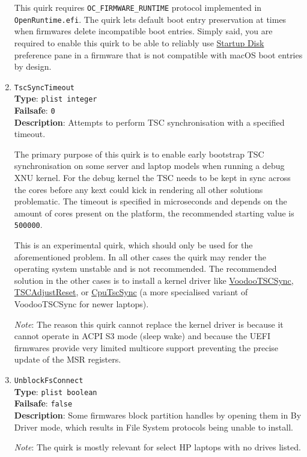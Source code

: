 \documentclass[]{article}
\begin{document}
\begin{enumerate}
  This quirk requires \texttt{OC\_FIRMWARE\_RUNTIME} protocol implemented
  in \texttt{OpenRuntime.efi}. The quirk lets default boot entry
  preservation at times when firmwares delete incompatible boot entries.
  Simply said, you are required to enable this quirk to be able to reliably
  use \href{https://support.apple.com/HT202796}{Startup Disk} preference
  pane in a firmware that is not compatible with macOS boot entries by design.

\item
  \texttt{TscSyncTimeout}\\
  \textbf{Type}: \texttt{plist\ integer}\\
  \textbf{Failsafe}: \texttt{0}\\
  \textbf{Description}: Attempts to perform TSC synchronisation with a specified timeout.

  The primary purpose of this quirk is to enable early bootstrap TSC synchronisation
  on some server and laptop models when running a debug XNU kernel. For the debug kernel
  the TSC needs to be kept in sync across the cores before any kext could kick in rendering
  all other solutions problematic. The timeout is specified in microseconds and depends on the
  amount of cores present on the platform, the recommended starting value is \texttt{500000}.

  This is an experimental quirk, which should only be used for the aforementioned problem.
  In all other cases the quirk may render the operating system unstable and is not recommended.
  The recommended solution in the other cases is to install a kernel driver like
  \href{https://github.com/RehabMan/VoodooTSCSync}{VoodooTSCSync},
  \href{https://github.com/interferenc/TSCAdjustReset}{TSCAdjustReset},
  or \href{https://github.com/lvs1974/CpuTscSync}{CpuTscSync} (a more specialised
  variant of VoodooTSCSync for newer laptops).

  \emph{Note}: The reason this quirk cannot replace the kernel driver is
  because it cannot operate in ACPI S3 mode (sleep wake) and because the UEFI firmwares
  provide very limited multicore support preventing the precise update of the MSR
  registers.

\item
  \texttt{UnblockFsConnect}\\
  \textbf{Type}: \texttt{plist\ boolean}\\
  \textbf{Failsafe}: \texttt{false}\\
  \textbf{Description}: Some firmwares block partition handles by opening them
  in By Driver mode, which results in File System protocols being unable to install.

  \emph{Note}: The quirk is mostly relevant for select HP laptops with no drives listed.

\end{enumerate}
\end{document}
